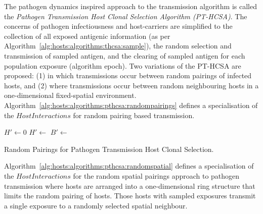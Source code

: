 The pathogen dynamics inspired approach to the transmission algorithm is called the \emph{Pathogen Transmission Host Clonal Selection Algorithm (PT-HCSA)}. The concerns of pathogen infectiousness and host-carriers are simplified to the collection of all exposed antigenic information (as per Algorithm~\ref{alg:hosts:algorithms:thcsa:sample}), the random selection and transmission of sampled antigen, and the clearing of sampled antigen for each population exposure (algorithm epoch). Two variations of the PT-HCSA are proposed: (1) in which transmissions occur between random pairings of infected hosts, and (2) where transmissions occur between random neighbouring hosts in a one-dimensional fixed-spatial environment. 
Algorithm~\ref{alg:hosts:algorithms:pthcsa:randompairings} defines a specialisation of the $HostInteractions$  for random pairing based transmission. 

\begin{algorithm}[ht]
  \SetLine  
  
  \KwIn{\Pop}		  
  
	{
		{
			$H\prime \leftarrow 0$\;
			{
				$H\prime \leftarrow$ \SelectRandomHost{\Pop}\;
			}
			$B\prime \leftarrow$ \;
			\;
		}		
	}
	\caption{Random Pairings for Pathogen Transmission Host Clonal Selection.}
	\label{alg:hosts:algorithms:pthcsa:randompairings}
\end{algorithm}

Algorithm~\ref{alg:hosts:algorithms:pthcsa:randomspatial} defines a specialisation of the $HostInteractions$ for the random spatial pairings approach to pathogen transmission where hosts are arranged into a one-dimensional ring structure that limits the random pairing of hosts. Those hosts with sampled exposures transmit a single exposure to a randomly selected spatial neighbour.


